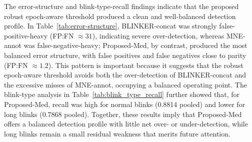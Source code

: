 The error-structure and blink-type-recall findings indicate that the proposed robust epoch-aware threshold produced a clean and well-balanced detection profile. In Table~\ref{tab:error-structure}, BLINKER-concat was strongly false-positive-heavy (FP:FN $\approx 31$), indicating severe over-detection, whereas MNE-annot was false-negative-heavy; Proposed-Med, by contrast, produced the most balanced error structure, with false positives and false negatives close to parity (FP:FN $\approx 1.2$). This pattern is important because it suggests that the robust epoch-aware threshold avoids both the over-detection of BLINKER-concat and the excessive misses of MNE-annot, occupying a balanced operating point. The blink-type analysis in Table~\ref{tab:blink_type_recall} further showed that, for Proposed-Med, recall was high for normal blinks (0.8814 pooled) and lower for long blinks (0.7868 pooled). Together, these results imply that Proposed-Med offers a balanced detection profile with little net over- or under-detection, while long blinks remain a small residual weakness that merits future attention.
